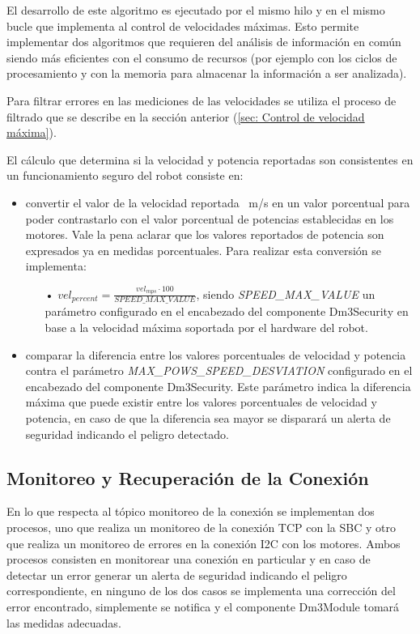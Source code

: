 \documentclass[withindex,glossary]{cam-thesis}
\begin{document}
El desarrollo de este algoritmo es ejecutado por el mismo hilo y en el mismo bucle que implementa al control de velocidades máximas. Esto permite implementar dos algoritmos que requieren del análisis de información en común siendo más eficientes con el consumo de recursos (por ejemplo con los ciclos de procesamiento y con la memoria para almacenar la información a ser analizada).

Para filtrar errores en las mediciones de las velocidades se utiliza el proceso de filtrado que se describe en la sección anterior (\ref{sec: Control de velocidad máxima}).

El cálculo que determina si la velocidad y potencia reportadas son consistentes en un funcionamiento seguro del robot consiste en:
\begin{itemize}
\item convertir el valor de la velocidad reportada \SI{}{\metre/\second} en un valor porcentual para poder contrastarlo con el valor porcentual de potencias establecidas en los motores. Vale la pena aclarar que los valores reportados de potencia son expresados ya en medidas porcentuales. Para realizar esta conversión se implementa:
\begin{itemize}
\item[•] $vel_{percent} =  \frac{ vel_{mps}  \cdot  100}{SPEED\_MAX\_VALUE}$, siendo \textit{SPEED\_MAX\_VALUE} un parámetro configurado en el encabezado del componente Dm3Security en base a la velocidad máxima soportada por el hardware del robot.
\end{itemize}
\item comparar la diferencia entre los valores porcentuales de velocidad y potencia contra el parámetro \textit{MAX\_POWS\_SPEED\_DESVIATION} configurado en el encabezado del componente Dm3Security. Este parámetro indica la diferencia máxima que puede existir entre los valores porcentuales de velocidad y potencia, en caso de que la diferencia sea mayor se disparará un alerta de seguridad indicando el peligro detectado.
\end{itemize} 

\subsection{Monitoreo y Recuperación de la Conexión}

En lo que respecta al tópico monitoreo de la conexión se implementan dos procesos, uno que realiza un monitoreo de la conexión TCP con la SBC y otro que realiza un monitoreo de errores en la conexión \gls{I2C} con los motores. Ambos procesos consisten en monitorear una conexión en particular y en caso de detectar un error generar un alerta de seguridad indicando el peligro correspondiente, en ninguno de los dos casos se implementa una corrección del error encontrado, simplemente se notifica y el componente Dm3Module tomará las medidas adecuadas.
\end{document}
